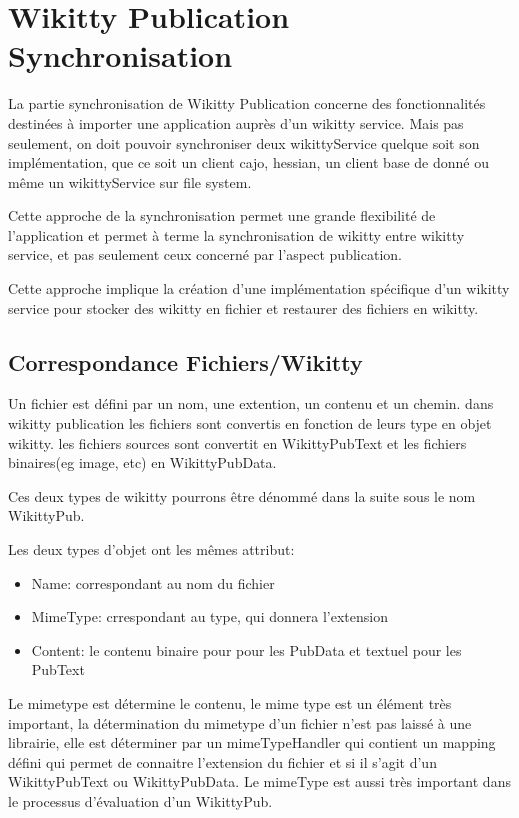 \section{Wikitty Publication Synchronisation}

La partie synchronisation de Wikitty Publication concerne des fonctionnalités
destinées à importer une application auprès d'un wikitty service. Mais pas
seulement, on doit pouvoir synchroniser deux wikittyService quelque soit son
implémentation, que ce soit un client cajo, hessian, un client base de donné ou
même un wikittyService sur file system.

Cette approche de la synchronisation permet une grande flexibilité de
l'application et permet à terme la synchronisation de wikitty entre wikitty
service, et pas seulement ceux concerné par l'aspect publication.

Cette approche implique la création d'une implémentation spécifique d'un wikitty
service pour stocker des wikitty en fichier et restaurer des fichiers en
wikitty.


\subsection{Correspondance Fichiers/Wikitty}

Un fichier est défini par un nom, une extention, un contenu et un chemin.
dans wikitty publication les fichiers sont convertis en fonction de leurs type
en objet wikitty. les fichiers sources sont convertit en WikittyPubText et les
fichiers binaires(eg image, etc) en WikittyPubData.

Ces deux types de wikitty pourrons être dénommé dans la suite sous le nom
WikittyPub. 

Les deux types d'objet ont les mêmes attribut:
\begin{itemize}
\item Name: correspondant au nom du fichier
\item MimeType: crrespondant au type, qui donnera l'extension
\item Content: le contenu binaire pour pour les PubData et textuel pour les
PubText
\end{itemize}

Le mimetype est détermine le contenu, le mime type est un élément très important,
la détermination du mimetype d'un fichier n'est pas laissé à une librairie,
elle est déterminer par un mimeTypeHandler qui contient un mapping défini
qui permet de connaitre l'extension du fichier et si il s'agit d'un 
WikittyPubText ou WikittyPubData. Le mimeType est aussi très important dans 
le processus d'évaluation d'un WikittyPub.


